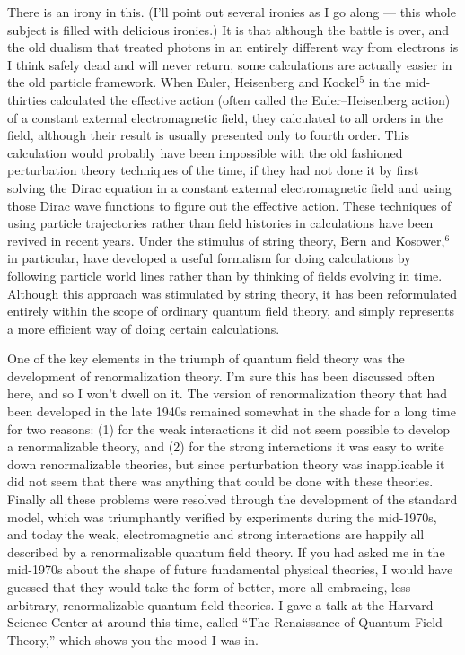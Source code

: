 There is an irony in this.  (I'll point out several ironies
as I go along --- this whole subject is filled with
delicious ironies.)  It is that although the battle is over,
and the old dualism that treated photons in an entirely
different way from electrons is I think safely dead and will
never return, some calculations are actually easier in the
old particle framework.  When Euler, Heisenberg and
Kockel$^5$
in the mid-thirties calculated the effective action (often
called the Euler--Heisenberg action) of a constant external
electromagnetic field, they calculated to all orders in the
field, although their result is usually  presented only to
fourth order.  This calculation would probably have been
impossible with the old fashioned perturbation theory
techniques of the time, if they had not done it by first
solving the Dirac equation in a constant external
electromagnetic field and using those Dirac wave functions
to figure out the effective action.  These techniques of
using particle trajectories  rather than field histories in
calculations have been revived in recent years. Under the
stimulus of string theory, Bern and Kosower,$^6$ in
particular,
have developed a useful formalism for doing calculations by
following particle world lines rather than by thinking of
fields evolving in time.  Although this approach was
stimulated by string theory, it has been reformulated
entirely within the scope of ordinary quantum field theory,
and simply represents a more efficient way of doing certain
calculations.

One of the key elements in the triumph of quantum field
theory was the development of renormalization theory.  I'm
sure this has been discussed often here, and so I won't
dwell on it.  The version of renormalization theory that had
been developed in the late 1940s remained somewhat in the
shade for a long time for two reasons:  (1) for the weak
interactions it did not seem possible to develop a
renormalizable theory, and (2) for the strong interactions
it was easy to write down renormalizable theories, but since
perturbation theory was inapplicable it did not seem that
there was anything that could be done with these theories.
Finally all these problems were resolved through the
development of the standard model, which was triumphantly
verified by experiments during the mid-1970s, and today the
weak, electromagnetic and strong interactions are happily
all described by a renormalizable quantum field theory.  If
you had asked me in the mid-1970s about the shape of future
fundamental physical theories, I would have guessed that
they would take the form of better, more all-embracing, less
arbitrary, renormalizable quantum field theories.  I gave a
talk at the Harvard Science Center at around this time,
called ``The Renaissance of Quantum Field Theory,'' which
shows you the mood I was in.

